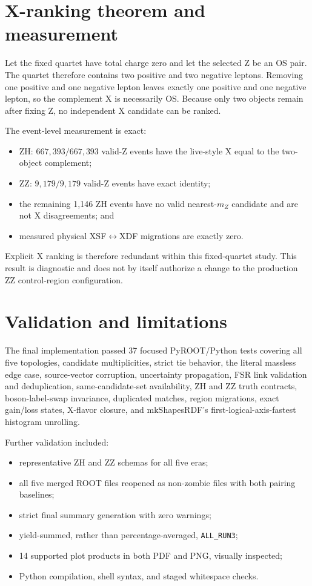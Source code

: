 \documentclass[11pt]{article}
\newcommand{\mZ}{m_{Z}}
\begin{document}
\section{X-ranking theorem and measurement}

Let the fixed quartet have total charge zero and let the selected Z be an OS
pair.  The quartet therefore contains two positive and two negative leptons.
Removing one positive and one negative lepton leaves exactly one positive and
one negative lepton, so the complement X is necessarily OS.  Because only two
objects remain after fixing Z, no independent X candidate can be ranked.

The event-level measurement is exact:
\begin{itemize}
  \item ZH: $667{,}393/667{,}393$ valid-Z events have the live-style X equal
        to the two-object complement;
  \item ZZ: $9{,}179/9{,}179$ valid-Z events have exact identity;
  \item the remaining 1,146 ZH events have no valid nearest-$\mZ$ candidate and
        are not X disagreements; and
  \item measured physical XSF$\leftrightarrow$XDF migrations are exactly zero.
\end{itemize}
Explicit X ranking is therefore redundant within this fixed-quartet study.
This result is diagnostic and does not by itself authorize a change to the
production ZZ control-region configuration.

\section{Validation and limitations}

The final implementation passed 37 focused PyROOT/Python tests covering all
five topologies, candidate multiplicities, strict tie behavior, the literal
massless edge case, source-vector corruption, uncertainty propagation, FSR
link validation and deduplication, same-candidate-set availability, ZH and ZZ
truth contracts, boson-label-swap invariance, duplicated matches, region
migrations, exact gain/loss states, X-flavor closure, and mkShapesRDF's
first-logical-axis-fastest histogram unrolling.

Further validation included:
\begin{itemize}
  \item representative ZH and ZZ schemas for all five eras;
  \item all five merged ROOT files reopened as non-zombie files with both
        pairing baselines;
  \item strict final summary generation with zero warnings;
  \item yield-summed, rather than percentage-averaged, \texttt{ALL\_RUN3};
  \item 14 supported plot products in both PDF and PNG, visually inspected;
  \item Python compilation, shell syntax, and staged whitespace checks.
\end{itemize}
\end{document}
